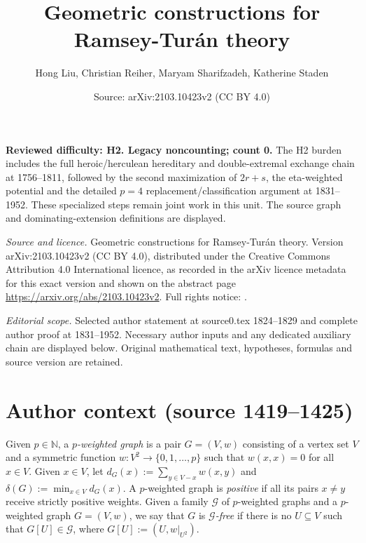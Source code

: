 \documentclass[10pt,a4paper]{amsart}
\title[Geometric constructions for Ramsey-Tur\'an theory]{Geometric constructions for Ramsey-Tur\'an theory}
\author{Hong Liu, Christian Reiher, Maryam Sharifzadeh, Katherine Staden}
\date{Source: arXiv:2103.10423v2 (CC BY 4.0)}
\begin{document}
\maketitle
\noindent\textbf{Reviewed difficulty: H2. Legacy noncounting; count 0.} The H2 burden includes the full heroic/herculean hereditary and double-extremal exchange chain at 1756--1811, followed by the second maximization of $2r+s$, the eta-weighted potential and the detailed $p=4$ replacement/classification argument at 1831--1952. These specialized steps remain joint work in this unit. The source graph and dominating-extension definitions are displayed.\par\medskip

\noindent\emph{Source and licence.} Geometric constructions for Ramsey-Tur\'an theory. Version arXiv:2103.10423v2 (CC BY 4.0), distributed under the Creative Commons Attribution 4.0 International licence, as recorded in the arXiv licence metadata for this exact version and shown on the abstract page \url{https://arxiv.org/abs/2103.10423v2}. Full rights notice: .\par\smallskip


\noindent\textit{Editorial scope.} Selected author statement at source0.tex 1824--1829 and complete author proof at 1831--1952. Necessary author inputs and any dedicated auxiliary chain are displayed below. Original mathematical text, hypotheses, formulas and source version are retained.\par\smallskip
\section*{Author context (source 1419--1425)}
Given $p\in\mathbb{N}$, a \emph{$p$-weighted graph} is a pair $G=(V,w)$ consisting of a vertex set $V$
and a symmetric function $w : V^2 \rightarrow \lbrace 0,1,\ldots, p\rbrace$ such that
$w(x,x)=0$ for all $x \in V$.
Given $x \in V$, let $d_G(x) := \sum_{y \in V-x}w(x,y)$ and $\delta(G) := \min_{x \in V}d_G(x)$. A $p$-weighted graph is \emph{positive} if all its pairs $x \neq y$ receive strictly positive weights.
Given a family $\mathcal{G}$ of $p$-weighted graphs and a $p$-weighted graph $G=(V,w)$, we say that $G$ is \emph{$\mathcal{G}$-free} if there is no $U \subseteq V$ such that $G[U] \in \mathcal{G}$, where
$G[U] := (U,w|_{U^2})$.
\end{document}
